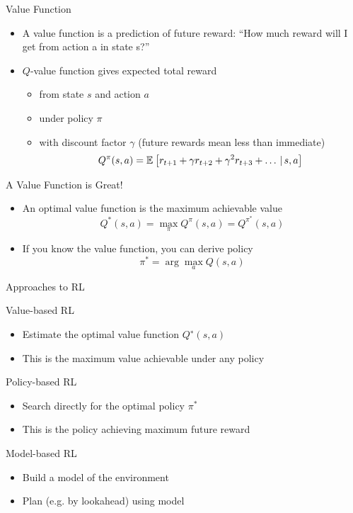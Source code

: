 \documentclass[compress]{beamer}
\begin{document}
\begin{frame}{Value Function}

  \begin{itemize}
\item A value function is a prediction of future reward: ``How much reward will I get from action a in state s?''
\item $Q$-value function gives expected total reward
\begin{itemize}
\item from state $s$ and action $a$
\item under policy $\pi$
\item with discount factor $\gamma$ (future rewards mean less than immediate)
\begin{equation}
Q^{\pi}(s, a) = \mathbb{E}_{}\left[ r_{t+1} + \gamma r_{t+2} + \gamma^2 r_{t+3} +
  \dots \, | \, s, a \right]
\end{equation}
  \end{itemize}
  \end{itemize}

\end{frame}


\begin{frame}{A Value Function is Great!}

  \begin{itemize}
    \item  An optimal value function is the maximum achievable value
      \begin{equation}
Q^{*}(s, a) = \max_\pi Q^{\pi}(s, a) = Q^{\pi^*}(s, a)
\end{equation}
    \item If you know the value function, you can derive policy
      \begin{equation}
\pi^{*} = \arg \max_a Q(s, a)
      \end{equation}

  \end{itemize}

\end{frame}


\begin{frame}{Approaches to RL}


Value-based RL
\begin{itemize}
\item Estimate the optimal value function $Q^∗(s, a)$
\item This is the maximum value achievable under any policy
\end{itemize}
Policy-based RL
\begin{itemize}
\item Search directly for the optimal policy $\pi^*$
\item This is the policy achieving maximum future reward
\end{itemize}
Model-based RL
\begin{itemize}
\item Build a model of the environment
\item Plan (e.g. by lookahead) using model
\end{itemize}


\end{frame}
\end{document}
